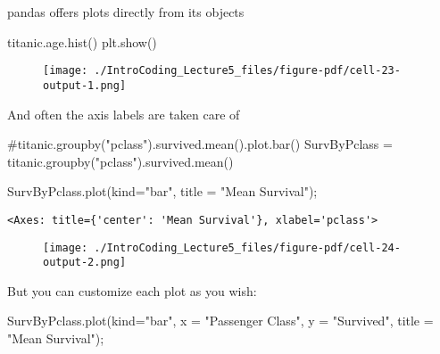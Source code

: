 \documentclass[
  letterpaper,
  DIV=11,
  numbers=noendperiod]{scrreprt}
\newenvironment{Shaded}{\begin{snugshade}}{\end{snugshade}}
\newcommand{\CommentTok}[1]{\textcolor[rgb]{0.37,0.37,0.37}{#1}}
\newcommand{\NormalTok}[1]{\textcolor[rgb]{0.00,0.23,0.31}{#1}}
\newcommand{\OperatorTok}[1]{\textcolor[rgb]{0.37,0.37,0.37}{#1}}
\newcommand{\StringTok}[1]{\textcolor[rgb]{0.13,0.47,0.30}{#1}}
\begin{document}
pandas offers plots directly from its objects

\begin{Shaded}
\begin{Highlighting}[]
\NormalTok{titanic.age.hist()}
\NormalTok{plt.show()}
\end{Highlighting}
\end{Shaded}

\begin{figure}[H]

{\centering \texttt{[image: ./IntroCoding\_Lecture5\_files/figure-pdf/cell-23-output-1.png]}

}

\end{figure}

And often the axis labels are taken care of

\begin{Shaded}
\begin{Highlighting}[]
\CommentTok{\#titanic.groupby("pclass").survived.mean().plot.bar()}
\NormalTok{SurvByPclass }\OperatorTok{=}\NormalTok{ titanic.groupby(}\StringTok{"pclass"}\NormalTok{).survived.mean()}

\NormalTok{SurvByPclass.plot(kind}\OperatorTok{=}\StringTok{"bar"}\NormalTok{, title }\OperatorTok{=} \StringTok{"Mean Survival"}\NormalTok{)}\OperatorTok{;}
\end{Highlighting}
\end{Shaded}

\begin{verbatim}
<Axes: title={'center': 'Mean Survival'}, xlabel='pclass'>
\end{verbatim}

\begin{figure}[H]

{\centering \texttt{[image: ./IntroCoding\_Lecture5\_files/figure-pdf/cell-24-output-2.png]}

}

\end{figure}

But you can customize each plot as you wish:

\begin{Shaded}
\begin{Highlighting}[]
\NormalTok{SurvByPclass.plot(kind}\OperatorTok{=}\StringTok{"bar"}\NormalTok{, x }\OperatorTok{=} \StringTok{"Passenger Class"}\NormalTok{, y }\OperatorTok{=} \StringTok{"Survived"}\NormalTok{, title }\OperatorTok{=} \StringTok{"Mean Survival"}\NormalTok{)}\OperatorTok{;}
\end{Highlighting}
\end{Shaded}
\end{document}
